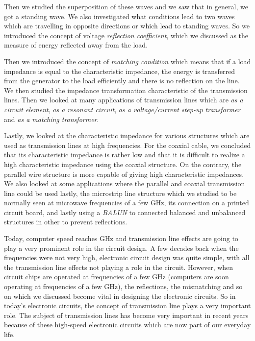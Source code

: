 Then we studied the superposition of these waves and we saw that in general, we got a standing wave. We also investigated what conditions lead to two waves which are travelling in opposite directions or which lead to standing waves. So we introduced the concept of voltage \emph{reflection coefficient}, which we discussed as the measure of energy reflected away from the load.

Then we introduced the concept of \emph{matching condition} which means that if a load impedance is equal to the characteristic impedance, the energy is transferred from the generator to the load efficiently and there is no reflection on the line. We then studied the impedance transformation characteristic of the transmission lines. Then we looked at many applications of transmission lines which are \emph{as a circuit element}, \emph{as a resonant circuit}, \emph{as a voltage/current step-up transformer} and \emph{as a matching transformer}.

Lastly, we looked at the characteristic impedance for various structures which are used as transmission lines at high frequencies. For the coaxial cable, we concluded that its characteristic impedance is rather low and that it is difficult to realize a high characteristic impedance using the coaxial structure. On the contrary, the parallel wire structure is more capable of giving high characteristic impedances. We also looked at some applications where the parallel and coaxial transmission line could be used lastly, the microstrip line structure which we studied to be normally seen at microwave frequencies of a few GHz, its connection on a printed circuit board, and lastly using a \emph{BALUN} to connected balanced and unbalanced structures in other to prevent reflections.

Today, computer speed reaches GHz and transmission line effects are going to play a very prominent role in the circuit design. A few decades back when the frequencies were not very high, electronic circuit design was quite simple, with all the transmission line effects not playing a role in the circuit. However, when circuit chips are operated at frequencies of a few GHz (computers are soon operating at frequencies of a few GHz), the reflections, the mismatching and so on which we discussed become vital in designing the electronic circuits. So in today's electronic circuits, the concept of transmission line plays a very important role. The subject of transmission lines has become very important in recent years because of these high-speed electronic circuits which are now part of our everyday life.

